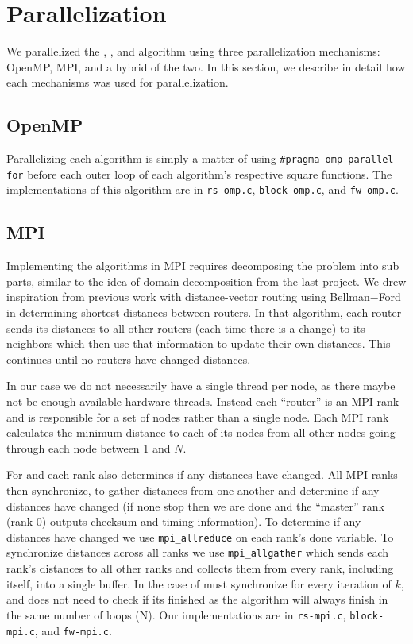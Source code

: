 \section{Parallelization}\label{sec:parallelization}
We parallelized the \rs{}, \block{}, and \fw{} algorithm using three
parallelization mechanisms: OpenMP, MPI, and a hybrid of the two. In this
section, we describe in detail how each mechanisms was used for parallelization.

\subsection{OpenMP}
Parallelizing each algorithm is simply a matter of using \texttt{\#pragma omp
parallel for} before each outer loop of each algorithm's respective square
functions. The implementations of this algorithm are in \texttt{rs-omp.c},
\texttt{block-omp.c}, and \texttt{fw-omp.c}.

\subsection{MPI}
Implementing the algorithms in MPI requires decomposing the problem into sub
parts, similar to the idea of domain decomposition from the last project. We
drew inspiration from previous work with distance-vector routing using
Bellman$-$Ford in determining shortest distances between routers. In that
algorithm, each router sends its distances to all other routers (each time
there is a change) to its neighbors which then use that information to update
their own distances. This continues until no routers have changed distances.

In our case we do not necessarily have a single thread per node, as there maybe
not be enough available hardware threads. Instead each ``router'' is an MPI
rank and is responsible for a set of nodes rather than a single node. Each MPI
rank calculates the minimum distance to each of its nodes from all other nodes
going through each node between 1 and $N$.

For \rs{} and \block{} each rank also determines if any distances have changed.
All MPI ranks then synchronize, to gather distances from one another and
determine if any distances have changed (if none stop then we are done and the
``master'' rank (rank 0) outputs checksum and timing information). To determine
if any distances have changed we use \texttt{mpi\_allreduce} on each rank's done
variable. To synchronize distances across all ranks we use
\texttt{mpi\_allgather} which sends each rank's distances to all other ranks and
collects them from every rank, including itself, into a single buffer. In the
case of \fw{} must synchronize for every iteration of $k$, and does not need to
check if its finished as the algorithm will always finish in the same number of
loops (N). Our implementations are in \texttt{rs-mpi.c}, \texttt{block-mpi.c},
and \texttt{fw-mpi.c}.

